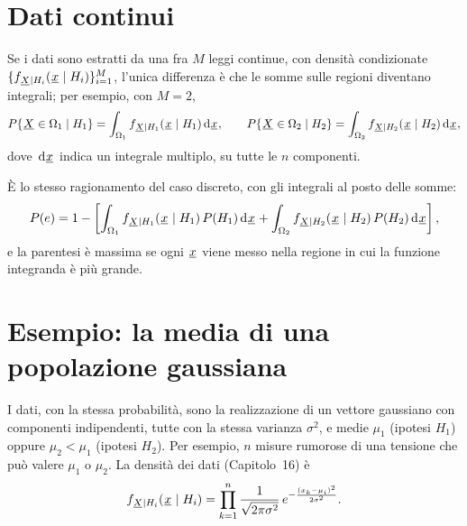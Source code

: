 \section{Dati continui}

Se i dati sono estratti da una fra $M$ leggi continue, con densità condizionate $\{f_{{\mkern1mu\underline{X}\mkern1mu} \mid H_i}({\mkern1mu\underline{x}\mkern1mu} \mid
H_i)\}_{i=1}^{M}$, l'unica differenza è che le somme sulle regioni diventano integrali; per esempio, con $M = 2$,
\[ P\{{\mkern1mu\underline{X}\mkern1mu} \in \Omega_1 \mid H_1\} = \int_{\Omega_1} f_{{\mkern1mu\underline{X}\mkern1mu} \mid H_1}({\mkern1mu\underline{x}\mkern1mu} \mid H_1) \,\mathrm{d}{\mkern1mu\underline{x}\mkern1mu} , \qquad
   P\{{\mkern1mu\underline{X}\mkern1mu} \in \Omega_2 \mid H_2\} = \int_{\Omega_2} f_{{\mkern1mu\underline{X}\mkern1mu} \mid H_2}({\mkern1mu\underline{x}\mkern1mu} \mid H_2) \,\mathrm{d}{\mkern1mu\underline{x}\mkern1mu} , \]
dove $\,\mathrm{d}{\mkern1mu\underline{x}\mkern1mu}$ indica un integrale multiplo, su tutte le $n$ componenti.


\begin{dimostrazione}
\passo{} È lo stesso ragionamento del caso discreto, con gli integrali al posto delle somme:
\[ P(e) = 1 - \left[ \int_{\Omega_1} f_{{\mkern1mu\underline{X}\mkern1mu} \mid H_1}({\mkern1mu\underline{x}\mkern1mu} \mid H_1)\, P(H_1) \,\mathrm{d}{\mkern1mu\underline{x}\mkern1mu} + \int_{\Omega_2}
   f_{{\mkern1mu\underline{X}\mkern1mu} \mid H_2}({\mkern1mu\underline{x}\mkern1mu} \mid H_2)\, P(H_2) \,\mathrm{d}{\mkern1mu\underline{x}\mkern1mu} \right] , \]
e la parentesi è massima se ogni ${\mkern1mu\underline{x}\mkern1mu}$ viene messo nella regione in cui la funzione integranda è più grande.
\end{dimostrazione}

\section{Esempio: la media di una popolazione gaussiana}

I dati, con la stessa probabilità, sono la realizzazione di un vettore gaussiano con componenti indipendenti, tutte con
la stessa varianza $\sigma^2$, e medie $\mu_1$ (ipotesi $H_1$) oppure $\mu_2 < \mu_1$ (ipotesi $H_2$). Per esempio, $n$
misure rumorose di una tensione che può valere $\mu_1$ o $\mu_2$. La densità dei dati (Capitolo~16) è
\[ f_{{\mkern1mu\underline{X}\mkern1mu} \mid H_i}({\mkern1mu\underline{x}\mkern1mu} \mid H_i) = \prod_{k=1}^{n} \frac{1}{\sqrt{2\pi\sigma^2}}\, e^{-\frac{(x_k -
   \mu_i)^2}{2\sigma^2}} . \]

